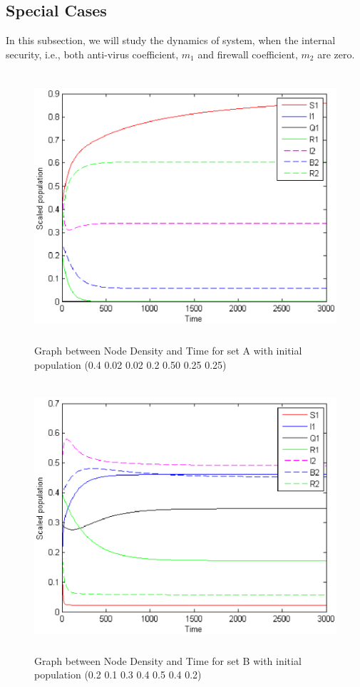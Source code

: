 \subsection{Special Cases}
In this subsection, we will study the dynamics of system,
when the internal security, i.e., both anti-virus coefficient, $m_1$ and firewall coefficient, $m_2$ are zero.
\begin{figure}
\centerline{\includegraphics[width=15cm,height=10cm]{13-DR10}}
\caption{Graph between Node Density and Time for set A with initial population (0.4  0.02  0.02  0.2  0.50  0.25  0.25)}
\label{fig:13-DR10}
\end{figure}
\begin{figure}
\centerline{\includegraphics[width=15cm,height=10cm]{13-DR15}}
\caption{Graph between Node Density and Time for set B with initial population (0.2  0.1  0.3  0.4  0.5  0.4  0.2)}
\label{fig:13-DR15}
\end{figure}
